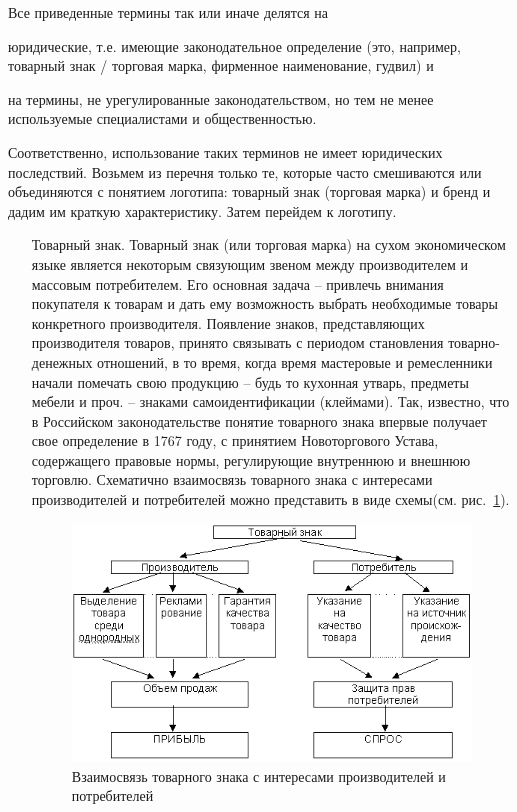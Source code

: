 Все приведенные термины так или иначе делятся на
\begin{enumerate*}[label=\asbuk*)]
\item юридические, т.е. имеющие законодательное определение
  (это, например, товарный знак / торговая марка, фирменное наименование, гудвил) и
\item на термины, не урегулированные законодательством, но тем не менее
  используемые специалистами и общественностью.
\end{enumerate*}
Соответственно, использование таких терминов не имеет юридических последствий.
Возьмем из перечня только те, которые часто смешиваются  или объединяются с
понятием логотипа: товарный знак (торговая марка) и бренд и дадим им краткую
характеристику. Затем перейдем к логотипу.

\begin{itemize}
\item[Товарный знак.] Товарный знак (или торговая марка) на сухом
  экономическом языке является некоторым связующим звеном между производителем
  и массовым потребителем. Его основная задача -- привлечь внимания покупателя к
  товарам и дать ему возможность выбрать необходимые товары конкретного
  производителя. Появление знаков, представляющих производителя товаров,
  принято связывать с периодом становления товарно-денежных отношений, в то
  время, когда время мастеровые и ремесленники начали помечать свою продукцию --
  будь то кухонная утварь, предметы мебели и проч. -- знаками
  самоидентификации (клеймами). Так, известно, что в Российском законодательстве
  понятие товарного знака впервые получает свое определение  в 1767 году,
  с принятием Новоторгового Устава, содержащего правовые нормы,
  регулирующие внутреннюю и внешнюю торговлю\autocite{pantuhinaAM}.
  Схематично взаимосвязь товарного знака с интересами производителей и
  потребителей можно представить в виде схемы(см. рис.~\ref{fig:pantuhina}).
  \begin{figure}[h!]
  \centering
  \includegraphics[width=.7\linewidth]{images/pantuhina}
  \caption{Взаимосвязь товарного знака с интересами производителей и потребителей}
  \label{fig:pantuhina}
\end{figure}


\end{itemize}
